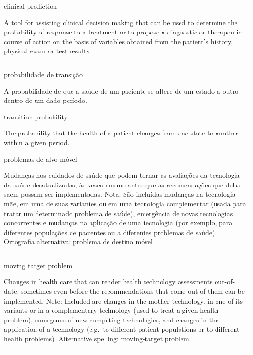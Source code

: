\documentclass[
  openany]{book}
\begin{document}
clinical prediction

A tool for assisting clinical decision making that can be used to determine the probability of response to a treatment or to propose a diagnostic or therapeutic course of action on the basis of variables obtained from the patient's history, physical exam or test results.

\begin{center}\rule{0.5\linewidth}{0.5pt}\end{center}

probabilidade de transição

A probabilidade de que a saúde de um paciente se altere de um estado a outro dentro de um dado período.

transition probability

The probability that the health of a patient changes from one state to another within a given period.

problemas de alvo móvel

Mudanças nos cuidados de saúde que podem tornar as avaliações da tecnologia da saúde desatualizadas, às vezes mesmo antes que as recomendações que delas saem possam ser implementadas. Nota: São incluídas mudanças na tecnologia mãe, em uma de suas variantes ou em uma tecnologia complementar (usada para tratar um determinado problema de saúde), emergência de novas tecnologias concorrentes e mudanças na aplicação de uma tecnologia (por exemplo, para diferentes populações de pacientes ou a diferentes problemas de saúde). Ortografia alternativa: problema de destino móvel

\begin{center}\rule{0.5\linewidth}{0.5pt}\end{center}

moving target problem

Changes in health care that can render health technology assessments out-of-date, sometimes even before the recommendations that come out of them can be implemented. Note: Included are changes in the mother technology, in one of its variants or in a complementary technology (used to treat a given health problem), emergence of new competing technologies, and changes in the application of a technology (e.g.~to different patient populations or to different health problems). Alternative spelling: moving-target problem

\begin{center}\rule{0.5\linewidth}{0.5pt}\end{center}
\end{document}
